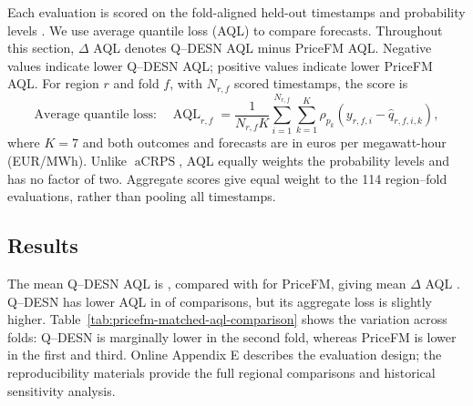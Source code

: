 \documentclass[12pt,letterpaper]{article}
\numberwithin{equation}{section}
\newcommand{\aCRPS}{\operatorname{aCRPS}}
\begin{document}
Each evaluation is scored on the fold-aligned held-out timestamps and
probability levels \PricefmFullPaperQuantiles. We use average quantile loss
(AQL) to compare forecasts. Throughout this section,
\(\Delta\) AQL denotes Q--DESN AQL minus PriceFM AQL. Negative values indicate
lower Q--DESN AQL; positive values indicate lower PriceFM AQL.
For region \(r\) and fold \(f\), with \(N_{r,f}\) scored timestamps, the score is
\begin{equation}
\text{Average quantile loss:}\quad
\operatorname{AQL}_{r,f}
=\frac{1}{N_{r,f}K}\sum_{i=1}^{N_{r,f}}\sum_{k=1}^{K}
\rho_{p_k}\!\left(y_{r,f,i}-\widehat q_{r,f,i,k}\right),
\label{eq:pricefm-aql-main}
\end{equation}
where \(K=7\) and both outcomes and forecasts are in euros per megawatt-hour
(EUR/MWh).
Unlike \(\aCRPS\), AQL equally weights the probability levels and has no
factor of two. Aggregate scores give equal weight to the 114 region--fold
evaluations, rather than pooling all timestamps.

\subsection{Results}

The mean Q--DESN AQL is
\PricefmFullMeanQdesnAql{}, compared with \PricefmFullMeanPricefmAql{} for
PriceFM, giving mean \(\Delta\) AQL \PricefmFullMeanDeltaAql{}.
Q--DESN has lower AQL in \PricefmFullQdesnWins{} of
\PricefmFullRegionFolds{} comparisons, but its aggregate loss is slightly
higher. Table~\ref{tab:pricefm-matched-aql-comparison} shows the variation
across folds: Q--DESN is marginally lower in the second fold, whereas
PriceFM is lower in the first and third. Online Appendix E describes the
evaluation design; the reproducibility materials provide the full regional
comparisons and historical sensitivity analysis.

\begin{table}[!htbp]
\centering
\caption{Matched electricity-price forecast comparison. Entries are unweighted
summaries across region--fold evaluations,
overall and by fold. The Q--DESN specification for each region was selected
using training and validation data and held fixed across its three test folds.
Here \(\Delta\) AQL is Q--DESN minus PriceFM, so negative values favor Q--DESN.
AQL is in EUR/MWh; all scores use matched held-out timestamps and the same
seven probability levels.}
\label{tab:pricefm-matched-aql-comparison}

\end{table}
\end{document}
